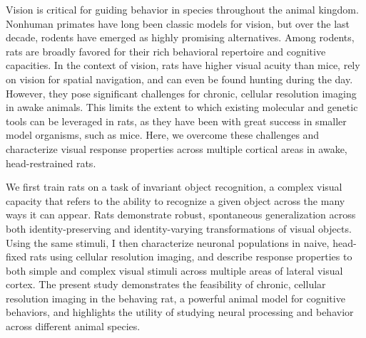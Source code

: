 
Vision is critical for guiding behavior in species throughout the animal kingdom. Nonhuman primates have long been classic models for vision, but over the last decade, rodents have emerged as highly promising alternatives. Among rodents, rats are broadly favored for their rich behavioral repertoire and cognitive capacities. In the context of vision, rats have higher visual acuity than mice, rely on vision for spatial navigation, and can even be found hunting during the day. However, they pose significant challenges for chronic, cellular resolution imaging in awake animals. This limits the extent to which existing molecular and genetic tools can be leveraged in rats, as they have been with great success in smaller model organisms, such as mice. Here, we overcome these challenges and characterize visual response properties across multiple cortical areas in awake, head-restrained rats. 

We first train rats on a task of invariant object recognition, a complex visual capacity that refers to the ability to recognize a given object across the many ways it can appear. Rats demonstrate robust, spontaneous generalization across both identity-preserving and identity-varying transformations of visual objects. Using the same stimuli, I then characterize neuronal populations in naive, head-fixed rats using cellular resolution imaging, and describe response properties to both simple and complex visual stimuli across multiple areas of lateral visual cortex. The present study demonstrates the feasibility of chronic, cellular resolution imaging in the behaving rat, a powerful animal model for cognitive behaviors, and highlights the utility of studying neural processing and behavior across different animal species.
